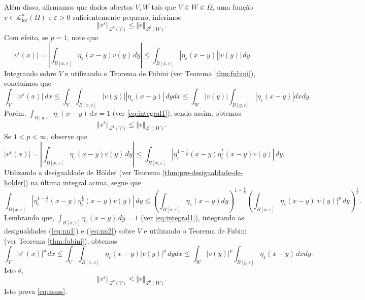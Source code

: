 \documentclass[a4paper, 11pt]{book}
\theoremstyle{definition}
\newcommand{\cL}{\mathcal{L}}
\newcommand{\loc}{\mathrm{loc}}
\begin{document}
\begin{prf}
    Além disso, afirmamos que dados abertos $V, W$ tais que $V \Subset W \Subset \Omega$, uma função $v \in \cL^p_\loc(\Omega)$ e $\varepsilon > 0$ suficientemente pequeno, inferimos
    \begin{equation} \label{eq:assss}
        \Vert v^\varepsilon \Vert_{\cL^p(V)} \leqslant \Vert v \Vert_{\cL^p(W)}.
    \end{equation}
    Com efeito, se $p = 1$, note que
    \[
        |v^\varepsilon(x)| =  \left| \int_{B[x,\varepsilon]} \eta_\varepsilon (x-y) v(y) \,dy \right| \leqslant \int_{B[x,\varepsilon]} |\eta_\varepsilon(x-y)| | v(y)| \,dy.
    \]
    Integrando sobre $V$ e utilizando o Teorema de Fubini (ver Teorema \ref{thm:fubini}), concluímos que
    \[
        \int_V |v^\varepsilon(x)| \,dx \leqslant \int_V  \int_{B[x,\varepsilon]} |v(y)||\eta_\varepsilon(x-y)| \, dydx \leqslant \int_W |v(y)| \int_{B[y,\varepsilon]} |\eta_\varepsilon (x-y)| dxdy.
    \]
    Porém, $\int_{B[y,\varepsilon]} \eta_\varepsilon(x- y) \,dx = 1$ (ver \ref{eq:integral1}); sendo assim, obtemos
    \[
        \Vert v^\varepsilon \Vert_{\cL^1(V)} \leqslant \Vert v \Vert_{\cL^1(W)}.
    \]
    Se $1 < p < \infty$, observe que
    \begin{equation} \label{eq:nn1}
        |v^\varepsilon(x)| = \left| \int_{B[x,\varepsilon]} \eta_\varepsilon(x-y) v(y) \,dy \right| \leqslant \int_{B[x,\varepsilon]} \left| \eta_\varepsilon^{1 - \frac{1}{p}} (x-y) \eta_\varepsilon^{\frac{1}{p}} (x-y) v(y) \right| \,dy.
    \end{equation}
    Utilizando a desigualdade de Hölder (ver Teorema \ref{thm:pre-desigualdade-de-holder}) na última integral acima, segue que
    {\small
        \begin{equation} \label{eq:nn2}
            \int_{B[x,\varepsilon]} \left| \eta_\varepsilon^{1 - \frac{1}{p}} (x-y) \eta_\varepsilon^{\frac{1}{p}} (x-y) v(y) \right| \,dy \leqslant \left( \int_{B[x,\varepsilon]} \eta_\varepsilon(x-y) dy \right)^{1 - \frac{1}{p}} \left( \int_{B[x,\varepsilon]} \eta_\varepsilon(x-y) |v(y)|^p \,dy \right)^{\frac{1}{p}}.
        \end{equation}
    }\!\!
    Lembrando que, $\int_{B[x,\varepsilon]} \eta_\varepsilon(x-y) \,dy = 1$ (ver \ref{eq:integral1}), integrando  as desigualdades (\ref{eq:nn1}) e (\ref{eq:nn2}) sobre $V$ e utilizando o Teorema de Fubini (ver Teorema \ref{thm:fubini}), obtemos
    \[
        \int_V |v^\varepsilon(x)|^p \,dx \leqslant \int_V \int_{B[x,\varepsilon]} \eta_\varepsilon(x-y) |v(y)|^p \,dy dx \leqslant \int_W |v(y)|^p \int_{B[y,\varepsilon]} \eta_\varepsilon(x-y) \,dxdy.
    \]
    Isto é,
    \begin{equation*}
        \Vert v^\varepsilon \Vert_{\cL^p(V)} \leqslant \Vert v \Vert_{\cL^p(W)}.
    \end{equation*}
    Isto prova \ref{eq:assss}.


\end{prf}
\end{document}
